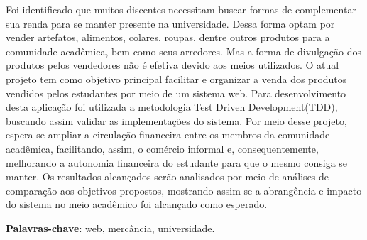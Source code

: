 
\setlength{\absparsep}{18pt} %
\begin{resumo}
Foi identificado que muitos discentes necessitam buscar formas de complementar sua renda para se manter presente na universidade. Dessa forma optam por vender artefatos, alimentos, colares, roupas, dentre outros produtos para a comunidade acadêmica, bem como seus arredores. Mas a forma de divulgação dos produtos pelos vendedores não é efetiva devido aos meios utilizados. O atual projeto tem como objetivo principal facilitar e organizar a venda dos produtos vendidos pelos estudantes por meio de um sistema web. Para desenvolvimento desta aplicação foi utilizada a metodologia Test Driven Development(TDD), buscando assim validar as implementações do sistema. Por meio desse projeto, espera-se ampliar a circulação financeira entre os membros da comunidade acadêmica, facilitando, assim, o comércio informal e, consequentemente, melhorando a autonomia financeira do estudante para que o mesmo consiga se manter. Os resultados alcançados serão analisados por meio de análises de comparação aos objetivos propostos, mostrando assim se a abrangência e impacto do sistema no meio acadêmico foi alcançado como esperado.


 \textbf{Palavras-chave}: web, mercância, universidade.
\end{resumo}


 

% 
%
%  
